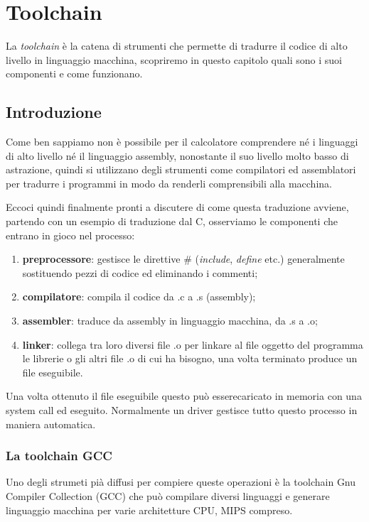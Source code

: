 \documentclass[class=book, crop=false, oneside]{standalone}
\begin{document}
\chapter{Toolchain}

La \emph{toolchain} è la catena di strumenti che permette di tradurre il codice di alto livello in linguaggio macchina, scopriremo in questo capitolo quali sono i suoi componenti e come funzionano.

\section{Introduzione}
Come ben sappiamo non è possibile per il calcolatore comprendere né i linguaggi di alto livello né il linguaggio assembly, nonostante il suo livello molto basso di astrazione, quindi si utilizzano degli strumenti come compilatori ed assemblatori per tradurre i programmi in modo da renderli comprensibili alla macchina.

Eccoci quindi finalmente pronti a discutere di come questa traduzione avviene, partendo con un esempio di traduzione dal C, osserviamo le componenti che entrano in gioco nel processo:
\begin{enumerate}
	\item \textbf{preprocessore}: gestisce le direttive \# (\emph{include}, \emph{define} etc.) generalmente sostituendo pezzi di codice ed eliminando i commenti;
	\item \textbf{compilatore}: compila il codice da .c a .s (assembly);
	\item \textbf{assembler}: traduce da assembly in linguaggio macchina, da .s a .o;
	\item \textbf{linker}: collega tra loro diversi file .o per linkare al file oggetto del programma le librerie o gli altri file .o di cui ha bisogno, una volta terminato produce un file eseguibile.
\end{enumerate}
Una volta ottenuto il file eseguibile questo può esserecaricato in memoria con una system call ed eseguito.
Normalmente un driver gestisce tutto questo processo in maniera automatica.

\subsection*{La toolchain GCC}
Uno degli strumeti pià diffusi per compiere queste operazioni è la toolchain Gnu Compiler Collection (GCC) che può compilare diversi linguaggi e generare linguaggio macchina per varie architetture CPU, MIPS compreso.
\end{document}

